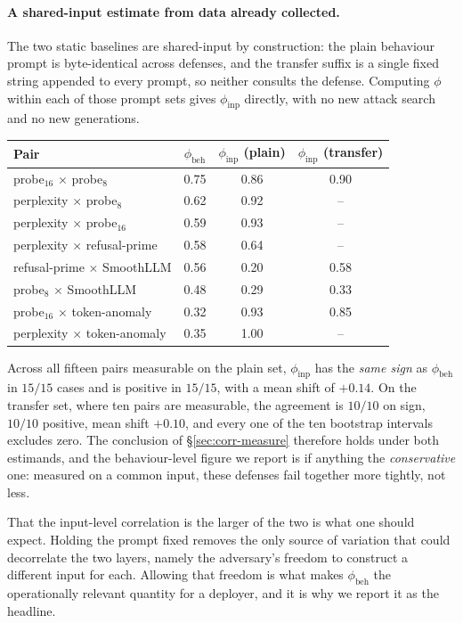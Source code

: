 \paragraph{A shared-input estimate from data already collected.}
The two static baselines are shared-input by construction: the plain behaviour prompt is
byte-identical across defenses, and the transfer suffix is a single fixed string appended to
every prompt, so neither consults the defense. Computing $\phi$ within each of those prompt
sets gives $\phi_{\mathrm{inp}}$ directly, with no new attack search and no new generations.

\begin{center}
\begin{tabular}{lccc}
\toprule
Pair & $\phi_{\mathrm{beh}}$ & $\phi_{\mathrm{inp}}$ (plain) & $\phi_{\mathrm{inp}}$ (transfer) \\
\midrule
probe$_{16}$ $\times$ probe$_{8}$   & 0.75 & 0.86 & 0.90 \\
perplexity $\times$ probe$_{8}$     & 0.62 & 0.92 & --   \\
perplexity $\times$ probe$_{16}$    & 0.59 & 0.93 & --   \\
perplexity $\times$ refusal-prime   & 0.58 & 0.64 & --   \\
refusal-prime $\times$ SmoothLLM    & 0.56 & 0.20 & 0.58 \\
probe$_{8}$ $\times$ SmoothLLM      & 0.48 & 0.29 & 0.33 \\
probe$_{16}$ $\times$ token-anomaly & 0.32 & 0.93 & 0.85 \\
perplexity $\times$ token-anomaly   & 0.35 & 1.00 & --   \\
\bottomrule
\end{tabular}
\end{center}

\noindent
Across all fifteen pairs measurable on the plain set, $\phi_{\mathrm{inp}}$ has the
\emph{same sign} as $\phi_{\mathrm{beh}}$ in $15/15$ cases and is positive in $15/15$, with a
mean shift of $+0.14$. On the transfer set, where ten pairs are measurable, the agreement is
$10/10$ on sign, $10/10$ positive, mean shift $+0.10$, and every one of the ten bootstrap
intervals excludes zero. The conclusion of \S\ref{sec:corr-measure} therefore holds under
both estimands, and the behaviour-level figure we report is if anything the
\emph{conservative} one: measured on a common input, these defenses fail together more
tightly, not less.

That the input-level correlation is the larger of the two is what one should expect. Holding
the prompt fixed removes the only source of variation that could decorrelate the two layers,
namely the adversary's freedom to construct a different input for each. Allowing that freedom
is what makes $\phi_{\mathrm{beh}}$ the operationally relevant quantity for a deployer, and
it is why we report it as the headline.

